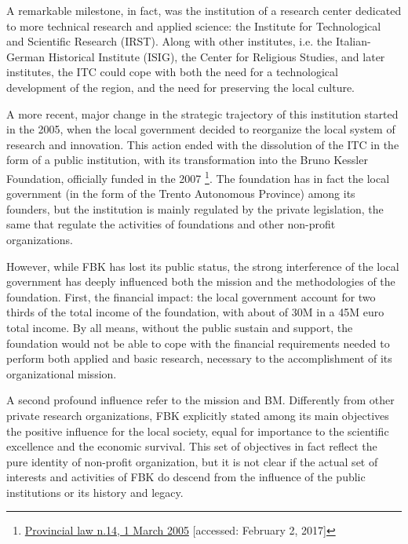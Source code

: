 A remarkable milestone, in fact, was the institution of a research center dedicated to more technical research and applied science: the Institute for Technological and Scientific Research (IRST). Along with other institutes, i.e. the Italian-German Historical Institute (ISIG), the Center for Religious Studies, and later institutes, the ITC could cope with both the need for a technological development of the region, and the need for preserving the local culture. 

A more recent, major change in the strategic trajectory of this institution started in the 2005, when the local government decided to reorganize the local system of research and innovation. This action ended with the dissolution of the ITC in the form of a public institution, with its transformation into the Bruno Kessler Foundation, officially funded in the 2007
\footnote{
	\href{http://www.consiglio.provincia.tn.it/leggi-e-archivi/codice-provinciale/archivio/Pages/Legge\%20provinciale\%202\%20agosto\%202005,\%20n.\%2014_12567.aspx?zid=6003d625-228e-4e5d-820d-d6cf459dfc36}
	{Provincial law n.14, 1 March 2005}
	[accessed: February 2, 2017]
}. 
The foundation has in fact the local government (in the form of the Trento Autonomous Province) among its founders, but the institution is mainly regulated by the private legislation, the same that regulate the activities of foundations and other non-profit organizations. 

However, while FBK has lost its public status, the strong interference of the local government has deeply influenced both the mission and the methodologies of the foundation. First, the financial impact: the local government account for two thirds of the total income of the foundation, with about of 30M in a 45M euro total income. By all means, without the public sustain and support, the foundation would not be able to cope with the financial requirements needed to perform both applied and basic research, necessary to the accomplishment of its organizational mission.

A second profound influence refer to the mission and BM. Differently from other private research organizations, FBK explicitly stated among its main objectives the positive influence for the local society, equal for importance to the scientific excellence and the economic survival. This set of objectives in fact reflect the pure identity of non-profit organization, but it is not clear if the actual set of interests and activities of FBK do descend from the influence of the public institutions or its history and legacy.

